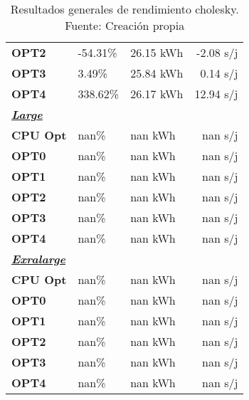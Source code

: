 \begin{table}[H]
\begin{tabular}{lllr}
    \cellcolor[HTML]{DAE8FC} \textbf{OPT2} & -54.31\%  &	26.15 kWh  &	-2.08 s/j \\
    \rowcolor[HTML]{EFEFEF} \cellcolor[HTML]{DAE8FC} \textbf{OPT3} &3.49\%  &	25.84 kWh  &	0.14 s/j \\
    \cellcolor[HTML]{DAE8FC} \textbf{OPT4} & 338.62\%  &	26.17 kWh  &	12.94 s/j \\
    \rowcolor[HTML]{EFEFEF} \cellcolor[HTML]{DAE8FC} \textbf{\textbf{{\emph{{\underline{{Large}}}}}}} &&	&	 \\
    \cellcolor[HTML]{DAE8FC} \textbf{CPU Opt} & nan\%  &	nan kWh  &	nan s/j \\
    \rowcolor[HTML]{EFEFEF} \cellcolor[HTML]{DAE8FC} \textbf{OPT0} &nan\%  &	nan kWh  &	nan s/j \\
    \cellcolor[HTML]{DAE8FC} \textbf{OPT1} & nan\%  &	nan kWh  &	nan s/j \\
    \rowcolor[HTML]{EFEFEF} \cellcolor[HTML]{DAE8FC} \textbf{OPT2} &nan\%  &	nan kWh  &	nan s/j \\
    \cellcolor[HTML]{DAE8FC} \textbf{OPT3} & nan\%  &	nan kWh  &	nan s/j \\
    \rowcolor[HTML]{EFEFEF} \cellcolor[HTML]{DAE8FC} \textbf{OPT4} &nan\%  &	nan kWh  &	nan s/j \\
    \cellcolor[HTML]{DAE8FC} \textbf{\textbf{{\emph{{\underline{{Exralarge}}}}}}} & &	&	 \\
    \rowcolor[HTML]{EFEFEF} \cellcolor[HTML]{DAE8FC} \textbf{CPU Opt} &nan\%  &	nan kWh  &	nan s/j \\
    \cellcolor[HTML]{DAE8FC} \textbf{OPT0} & nan\%  &	nan kWh  &	nan s/j \\
    \rowcolor[HTML]{EFEFEF} \cellcolor[HTML]{DAE8FC} \textbf{OPT1} &nan\%  &	nan kWh  &	nan s/j \\
    \cellcolor[HTML]{DAE8FC} \textbf{OPT2} & nan\%  &	nan kWh  &	nan s/j \\
    \rowcolor[HTML]{EFEFEF} \cellcolor[HTML]{DAE8FC} \textbf{OPT3} &nan\%  &	nan kWh  &	nan s/j \\
    \cellcolor[HTML]{DAE8FC} \textbf{OPT4} & nan\%  &	nan kWh  &	nan s/j \\
    \end{tabular}
    \caption[Resultados generales de rendimiento cholesky]{{Resultados generales de rendimiento cholesky. Fuente: Creación propia}}
    \label{table_global_cholesky_PowerResults_speedup-energy}
\end{table}